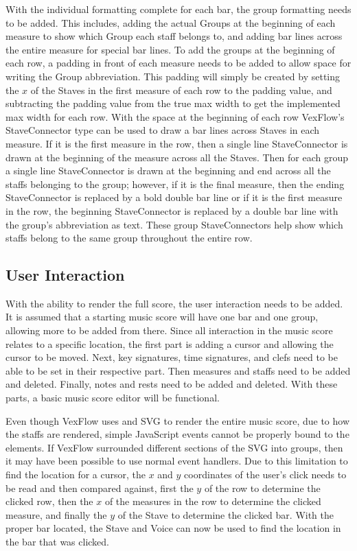 \documentclass[letterpaper,12pt]{article}
\begin{document}
With the individual formatting complete for each bar, the group formatting needs to be added. This includes, adding
the actual Groups at the beginning of each measure to show which Group each staff belongs to, and adding bar lines
across the entire measure for special bar lines. To add the groups at the beginning of each row, a padding in front of
each measure needs to be added to allow space for writing the Group abbreviation. This padding will simply be created by
setting the $ x $ of the Staves in the first measure of each row to the padding value, and subtracting the padding
value from the true max width to get the implemented max width for each row. With the space at the beginning of each
row VexFlow's StaveConnector type can be used to draw a bar lines across Staves in each measure. If it is the first
measure in the row, then a single line StaveConnector is drawn at the beginning of the measure across all the Staves.
Then for each group a single line StaveConnector is drawn at the beginning and end across all the staffs belonging to
the group; however, if it is the final measure, then the ending StaveConnector is replaced by a bold double bar line or
if it is the first measure in the row, the beginning StaveConnector is replaced by a double bar line with the group's
abbreviation as text. These group StaveConnectors help show which staffs belong to the same group throughout the entire
row.

\subsection{User Interaction}

With the ability to render the full score, the user interaction needs to be added. It is assumed that a starting music
score will have one bar and one group, allowing more to be added from there. Since all interaction in the music score
relates to a specific location, the first part is adding a cursor and allowing the cursor to be moved. Next, key
signatures, time signatures, and clefs need to be able to be set in their respective part. Then measures and staffs need
to be added and deleted. Finally, notes and rests need to be added and deleted. With these parts, a basic music score
editor will be functional.

Even though VexFlow uses and SVG to render the entire music score, due to how the staffs are rendered, simple JavaScript
events cannot be properly bound to the elements. If VexFlow surrounded different sections of the SVG into groups, then
it may have been possible to use normal event handlers. Due to this limitation to find the location for a cursor, the
$ x $ and $ y $ coordinates of the user's click needs to be read and then compared against, first the $ y $ of the row
to determine the clicked row, then the $ x $ of the measures in the row to determine the clicked measure, and finally
the $ y $ of the Stave to determine the clicked bar. With the proper bar located, the Stave and Voice can now be used to
find the location in the bar that was clicked.
\end{document}
